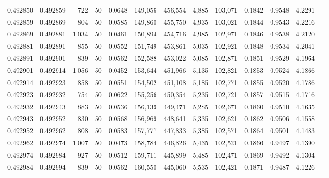 \begin{tabular}{rrrrrrrrrrrrr}
0.492850 & 0.492859 &   722 &  50 &                                     0.0648 & 149,056 & 456,554 &   4,885 & 103,071 & 0.1842 & 0.9548 & 4.2291 \\
0.492859 & 0.492869 &   804 &  50 &                                     0.0585 & 149,860 & 455,750 &   4,935 & 103,021 & 0.1844 & 0.9543 & 4.2216 \\
0.492869 & 0.492881 & 1,034 &  50 &                                     0.0461 & 150,894 & 454,716 &   4,985 & 102,971 & 0.1846 & 0.9538 & 4.2120 \\
0.492881 & 0.492891 &   855 &  50 &                                     0.0552 & 151,749 & 453,861 &   5,035 & 102,921 & 0.1848 & 0.9534 & 4.2041 \\
0.492891 & 0.492901 &   839 &  50 &                                     0.0562 & 152,588 & 453,022 &   5,085 & 102,871 & 0.1851 & 0.9529 & 4.1964 \\
0.492901 & 0.492914 & 1,056 &  50 &                                     0.0452 & 153,644 & 451,966 &   5,135 & 102,821 & 0.1853 & 0.9524 & 4.1866 \\
0.492914 & 0.492923 &   858 &  50 &                                     0.0551 & 154,502 & 451,108 &   5,185 & 102,771 & 0.1855 & 0.9520 & 4.1786 \\
0.492923 & 0.492932 &   754 &  50 &                                     0.0622 & 155,256 & 450,354 &   5,235 & 102,721 & 0.1857 & 0.9515 & 4.1716 \\
0.492932 & 0.492943 &   883 &  50 &                                     0.0536 & 156,139 & 449,471 &   5,285 & 102,671 & 0.1860 & 0.9510 & 4.1635 \\
0.492943 & 0.492952 &   830 &  50 &                                     0.0568 & 156,969 & 448,641 &   5,335 & 102,621 & 0.1862 & 0.9506 & 4.1558 \\
0.492952 & 0.492962 &   808 &  50 &                                     0.0583 & 157,777 & 447,833 &   5,385 & 102,571 & 0.1864 & 0.9501 & 4.1483 \\
0.492962 & 0.492974 & 1,007 &  50 &                                     0.0473 & 158,784 & 446,826 &   5,435 & 102,521 & 0.1866 & 0.9497 & 4.1390 \\
0.492974 & 0.492984 &   927 &  50 &                                     0.0512 & 159,711 & 445,899 &   5,485 & 102,471 & 0.1869 & 0.9492 & 4.1304 \\
0.492984 & 0.492994 &   839 &  50 &                                     0.0562 & 160,550 & 445,060 &   5,535 & 102,421 & 0.1871 & 0.9487 & 4.1226 \\

\end{tabular}
